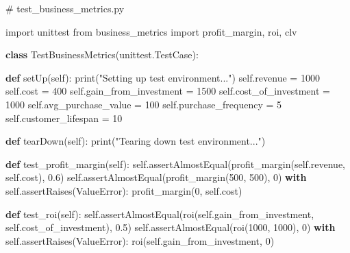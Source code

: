 \documentclass[
  letterpaper,
  DIV=11,
  numbers=noendperiod]{scrreprt}
\newenvironment{Shaded}{\begin{snugshade}}{\end{snugshade}}
\newcommand{\BuiltInTok}[1]{\textcolor[rgb]{0.00,0.23,0.31}{#1}}
\newcommand{\CommentTok}[1]{\textcolor[rgb]{0.37,0.37,0.37}{#1}}
\newcommand{\ControlFlowTok}[1]{\textcolor[rgb]{0.00,0.23,0.31}{\textbf{#1}}}
\newcommand{\DecValTok}[1]{\textcolor[rgb]{0.68,0.00,0.00}{#1}}
\newcommand{\FloatTok}[1]{\textcolor[rgb]{0.68,0.00,0.00}{#1}}
\newcommand{\ImportTok}[1]{\textcolor[rgb]{0.00,0.46,0.62}{#1}}
\newcommand{\KeywordTok}[1]{\textcolor[rgb]{0.00,0.23,0.31}{\textbf{#1}}}
\newcommand{\NormalTok}[1]{\textcolor[rgb]{0.00,0.23,0.31}{#1}}
\newcommand{\OperatorTok}[1]{\textcolor[rgb]{0.37,0.37,0.37}{#1}}
\newcommand{\PreprocessorTok}[1]{\textcolor[rgb]{0.68,0.00,0.00}{#1}}
\newcommand{\StringTok}[1]{\textcolor[rgb]{0.13,0.47,0.30}{#1}}
\newcommand{\VariableTok}[1]{\textcolor[rgb]{0.07,0.07,0.07}{#1}}
\begin{document}
\begin{Shaded}
\begin{Highlighting}[]
\CommentTok{\# test\_business\_metrics.py}

\ImportTok{import}\NormalTok{ unittest}
\ImportTok{from}\NormalTok{ business\_metrics }\ImportTok{import}\NormalTok{ profit\_margin, roi, clv}

\KeywordTok{class}\NormalTok{ TestBusinessMetrics(unittest.TestCase):}

    \KeywordTok{def}\NormalTok{ setUp(}\VariableTok{self}\NormalTok{):}
        \BuiltInTok{print}\NormalTok{(}\StringTok{"Setting up test environment..."}\NormalTok{)}
        \VariableTok{self}\NormalTok{.revenue }\OperatorTok{=} \DecValTok{1000}
        \VariableTok{self}\NormalTok{.cost }\OperatorTok{=} \DecValTok{400}
        \VariableTok{self}\NormalTok{.gain\_from\_investment }\OperatorTok{=} \DecValTok{1500}
        \VariableTok{self}\NormalTok{.cost\_of\_investment }\OperatorTok{=} \DecValTok{1000}
        \VariableTok{self}\NormalTok{.avg\_purchase\_value }\OperatorTok{=} \DecValTok{100}
        \VariableTok{self}\NormalTok{.purchase\_frequency }\OperatorTok{=} \DecValTok{5}
        \VariableTok{self}\NormalTok{.customer\_lifespan }\OperatorTok{=} \DecValTok{10}

    \KeywordTok{def}\NormalTok{ tearDown(}\VariableTok{self}\NormalTok{):}
        \BuiltInTok{print}\NormalTok{(}\StringTok{"Tearing down test environment..."}\NormalTok{)}

    \KeywordTok{def}\NormalTok{ test\_profit\_margin(}\VariableTok{self}\NormalTok{):}
        \VariableTok{self}\NormalTok{.assertAlmostEqual(profit\_margin(}\VariableTok{self}\NormalTok{.revenue, }\VariableTok{self}\NormalTok{.cost), }\FloatTok{0.6}\NormalTok{)}
        \VariableTok{self}\NormalTok{.assertAlmostEqual(profit\_margin(}\DecValTok{500}\NormalTok{, }\DecValTok{500}\NormalTok{), }\DecValTok{0}\NormalTok{)}
        \ControlFlowTok{with} \VariableTok{self}\NormalTok{.assertRaises(}\PreprocessorTok{ValueError}\NormalTok{):}
\NormalTok{            profit\_margin(}\DecValTok{0}\NormalTok{, }\VariableTok{self}\NormalTok{.cost)}

    \KeywordTok{def}\NormalTok{ test\_roi(}\VariableTok{self}\NormalTok{):}
        \VariableTok{self}\NormalTok{.assertAlmostEqual(roi(}\VariableTok{self}\NormalTok{.gain\_from\_investment, }\VariableTok{self}\NormalTok{.cost\_of\_investment), }\FloatTok{0.5}\NormalTok{)}
        \VariableTok{self}\NormalTok{.assertAlmostEqual(roi(}\DecValTok{1000}\NormalTok{, }\DecValTok{1000}\NormalTok{), }\DecValTok{0}\NormalTok{)}
        \ControlFlowTok{with} \VariableTok{self}\NormalTok{.assertRaises(}\PreprocessorTok{ValueError}\NormalTok{):}
\NormalTok{            roi(}\VariableTok{self}\NormalTok{.gain\_from\_investment, }\DecValTok{0}\NormalTok{)}


\end{Highlighting}
\end{Shaded}
\end{document}
